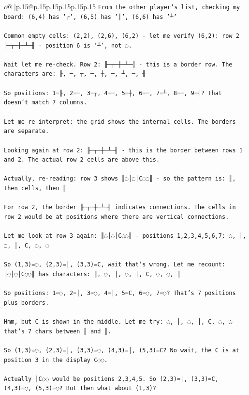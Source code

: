 \documentclass{article}
\begin{document}
{\begin{supertabular}{c@{$\;$}|p{.15\linewidth}@{}p{.15\linewidth}p{.15\linewidth}p{.15\linewidth}p{.15\linewidth}p{.15\linewidth}}
{{{\texttt{From the other player's list, checking my board: (6,4) has '┌', (6,5) has '│', (6,6) has '┴'} \\
\\ 
\texttt{Common empty cells: (2,2), (2,6), (6,2) {-} let me verify (6,2): row 2 ╟─┬─┼─┴─╢ {-} position 6 is '┴', not ◌.} \\
\\ 
\texttt{Wait let me re{-}check. Row 2: ╟─┬─┼─┴─╢ {-} this is a border row. The characters are: ╟, ─, ┬, ─, ┼, ─, ┴, ─, ╢} \\
\\ 
\texttt{So positions: 1=╟, 2=─, 3=┬, 4=─, 5=┼, 6=─, 7=┴, 8=─, 9=╢? That doesn't match 7 columns.} \\
\\ 
\texttt{Let me re{-}interpret: the grid shows the internal cells. The borders are separate.} \\
\\ 
\texttt{Looking again at row 2: ╟─┬─┼─┴─╢ {-} this is the border between rows 1 and 2. The actual row 2 cells are above this.} \\
\\ 
\texttt{Actually, re{-}reading: row 3 shows ║◌│◌│C◌◌║ {-} so the pattern is: ║, then cells, then ║} \\
\\ 
\texttt{For row 2, the border ╟─┬─┼─┴─╢ indicates connections. The cells in row 2 would be at positions where there are vertical connections.} \\
\\ 
\texttt{Let me look at row 3 again: ║◌│◌│C◌◌║ {-} positions 1,2,3,4,5,6,7: ◌, │, ◌, │, C, ◌, ◌} \\
\\ 
\texttt{So (1,3)=◌, (2,3)=│, (3,3)=C, wait that's wrong. Let me recount: ║◌│◌│C◌◌║ has characters: ║, ◌, │, ◌, │, C, ◌, ◌, ║} \\
\\ 
\texttt{So positions: 1=◌, 2=│, 3=◌, 4=│, 5=C, 6=◌, 7=◌? That's 7 positions plus borders.} \\
\\ 
\texttt{Hmm, but C is shown in the middle. Let me try: ◌, │, ◌, │, C, ◌, ◌ {-} that's 7 chars between ║ and ║.} \\
\\ 
\texttt{So (1,3)=◌, (2,3)=│, (3,3)=◌, (4,3)=│, (5,3)=C? No wait, the C is at position 3 in the display C◌◌.} \\
\\ 
\texttt{Actually │C◌◌ would be positions 2,3,4,5. So (2,3)=│, (3,3)=C, (4,3)=◌, (5,3)=◌? But then what about (1,3)?} \\
}}}
\end{supertabular}}
\end{document}
